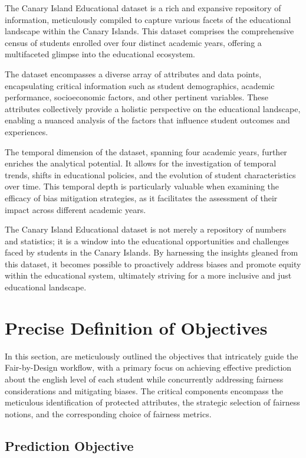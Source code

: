 The Canary Island Educational dataset is a rich and expansive repository of information, meticulously compiled to capture various facets of the educational landscape within the Canary Islands. This dataset comprises the comprehensive census of students enrolled over four distinct academic years, offering a multifaceted glimpse into the educational ecosystem. 

The dataset encompasses a diverse array of attributes and data points, encapsulating critical information such as student demographics, academic performance, socioeconomic factors, and other pertinent variables. These attributes collectively provide a holistic perspective on the educational landscape, enabling a nuanced analysis of the factors that influence student outcomes and experiences. 

The temporal dimension of the dataset, spanning four academic years, further enriches the analytical potential. It allows for the investigation of temporal trends, shifts in educational policies, and the evolution of student characteristics over time. This temporal depth is particularly valuable when examining the efficacy of bias mitigation strategies, as it facilitates the assessment of their impact across different academic years. 

The Canary Island Educational dataset is not merely a repository of numbers and statistics; it is a window into the educational opportunities and challenges faced by students in the Canary Islands. By harnessing the insights gleaned from this dataset, it becomes possible to proactively address biases and promote equity within the educational system, ultimately striving for a more inclusive and just educational landscape.

\section{Precise Definition of Objectives}
\label{section:val_obj}

In this section, are meticulously outlined the objectives that intricately guide the Fair-by-Design workflow, with a primary focus on achieving effective prediction about the english level of each student while concurrently addressing fairness considerations and mitigating biases. The critical components encompass the meticulous identification of protected attributes, the strategic selection of fairness notions, and the corresponding choice of fairness metrics.

\subsection{Prediction Objective}

